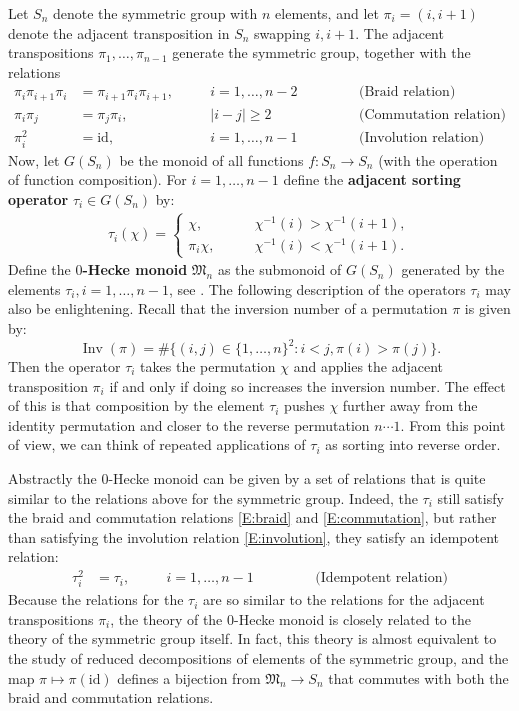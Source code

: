 \documentclass[11pt]{article}
\newcommand{\id}{\text{id}}
\theoremstyle{definition} %
\theoremstyle{remark} %
\begin{document}
Let $S_n$ denote the symmetric group with $n$ elements, and let $\pi_i = (i, i + 1)$ denote the adjacent transposition in $S_n$ swapping $i, i + 1$. The adjacent transpositions $\pi_1, \dots, \pi_{n-1}$ generate the symmetric group, together with the relations
\begin{align}
\label{E:braid}
\pi_i \pi_{i+1} \pi_i &= \pi_{i+1} \pi_i \pi_{i+1}, \quad &&i = 1, \dots, n-2 \qquad &&&\text{(Braid relation)}\\
\label{E:commutation}
\pi_i \pi_j &= \pi_j \pi_i, \quad &&|i - j| \ge 2 \qquad &&&\text{(Commutation relation)}\\
\label{E:involution}
\pi_i^2 &= \id, \quad &&i = 1, \dots, n-1 \qquad &&&\text{(Involution relation)}
\end{align}
Now, let 
$
G(S_n)
$
be the monoid of all functions $f:S_n \to S_n$ (with the operation of function composition). For $i = 1, \dots, n-1$ define the \textbf{adjacent sorting operator} $\tau_i \in G(S_n)$ by:
\begin{align*}
\tau_i(\chi) = \begin{cases}
\chi, \qquad &\chi^{-1}(i) > \chi^{-1}(i+1), \\
\pi_i \chi, \qquad &\chi^{-1}(i) < \chi^{-1}(i+1).
\end{cases}
\end{align*}
Define the \textbf{$0$-Hecke monoid} $\mathfrak{M}_n$ as the submonoid of $G(S_n)$ generated by the elements $\tau_i, i = 1, \dots, n-1$, see \cite{Norton1979}.
The following description of the operators $\tau_i$ may also be enlightening. Recall that the inversion number of a permutation $\pi$ is given by:
$$
\operatorname{Inv}(\pi) = \#\{(i, j) \in  \{1, \dots, n\}^2 : i < j, \pi(i) > \pi(j)\}.
$$
Then the operator $\tau_i$ takes the permutation $\chi$ and applies the adjacent transposition $\pi_i$ if and only if doing so increases the inversion number. The effect of this is that composition by the element $\tau_i$ pushes $\chi$ further away from the identity permutation and closer to the reverse permutation $n \cdots 1$. From this point of view, we can think of repeated applications of $\tau_i$ as sorting into reverse order.

Abstractly the $0$-Hecke monoid can be given by a set of relations that is quite similar to the relations above for the symmetric group. Indeed, the $\tau_i$ still satisfy the braid and commutation relations \eqref{E:braid} and \eqref{E:commutation}, but rather than satisfying the involution relation \eqref{E:involution}, they satisfy an idempotent relation: 
\begin{align}
\label{E:idempotent}
\tau_i^2 &= \tau_i, \quad &&i = 1, \dots, n-1 \qquad &&&\text{(Idempotent relation)}
\end{align}
Because the relations for the $\tau_i$ are so similar to the relations for the adjacent transpositions $\pi_i$, the theory of the $0$-Hecke monoid is closely related to the theory of the symmetric group itself. In fact, this theory is almost equivalent to the study of reduced decompositions of elements of the symmetric group, and the map $\pi \mapsto \pi(\id)$ defines a bijection from $\mathfrak{M}_n \to S_n$ that commutes with both the braid and commutation relations.
\end{document}
